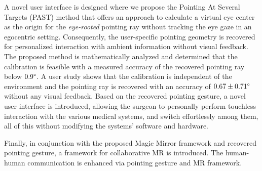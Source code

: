 A novel user interface is designed where we propose the Pointing At Several Targets (PAST) method that offers an approach to calculate a virtual eye center as the origin for the \textit{eye-rooted} pointing ray without tracking the eye gaze in an egocentric setting. Consequently, the user-specific pointing geometry is recovered for personalized interaction with ambient information without visual feedback.
The proposed method is mathematically analyzed and determined that the calibration is feasible with a measured accuracy of the recovered pointing ray below $0.9\degree$.
A user study shows that the calibration is independent of the environment and the pointing ray is recovered with an accuracy of $0.67 \pm 0.71\degree$ without any visual feedback. 
Based on the recovered pointing gesture, a novel user interface is introduced, allowing the surgeon to personally perform touchless interaction with the {various} medical systems, and switch effortlessly among them, all of this without modifying the systems' software and hardware.

Finally, in conjunction with the proposed Magic Mirror framework and recovered pointing gesture, a framework for collaborative MR is introduced. The human-human communication is enhanced via pointing gesture and MR framework. 



%
%
